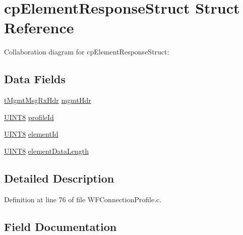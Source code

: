 \hypertarget{structcp_element_response_struct}{}\section{cp\+Element\+Response\+Struct Struct Reference}
\label{structcp_element_response_struct}


Collaboration diagram for cp\+Element\+Response\+Struct\+:
\subsection*{Data Fields}
\begin{DoxyCompactItemize}
\item 
\hyperlink{_w_f_mgmt_msg_8h_aaec9ea808e7028d854dc40394ff6f6b5}{t\+Mgmt\+Msg\+Rx\+Hdr} \hyperlink{structcp_element_response_struct_a7267478e6419a759f2c5eaa97eaacab7}{mgmt\+Hdr}
\item 
\hyperlink{_generic_type_defs_8h_ab27e9918b538ce9d8ca692479b375b6a}{U\+I\+N\+T8} \hyperlink{structcp_element_response_struct_a642b6a0cbb1e521844300ab1ba775f98}{profile\+Id}
\item 
\hyperlink{_generic_type_defs_8h_ab27e9918b538ce9d8ca692479b375b6a}{U\+I\+N\+T8} \hyperlink{structcp_element_response_struct_ae18351951739d45fe4aa49cb03e336c9}{element\+Id}
\item 
\hyperlink{_generic_type_defs_8h_ab27e9918b538ce9d8ca692479b375b6a}{U\+I\+N\+T8} \hyperlink{structcp_element_response_struct_aea3027ceda8675b2b9d4341261c02814}{element\+Data\+Length}
\end{DoxyCompactItemize}


\subsection{Detailed Description}


Definition at line 76 of file W\+F\+Connection\+Profile.\+c.



\subsection{Field Documentation}
\hypertarget{structcp_element_response_struct_aea3027ceda8675b2b9d4341261c02814}{}
